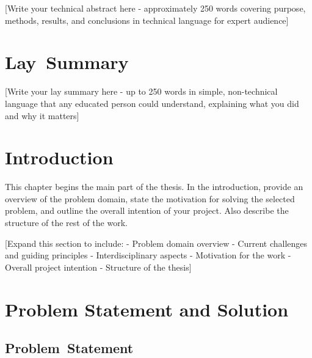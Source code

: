 \documentclass[11pt,a4paper,oneside]{book}
\begin{document}
[Write your technical abstract here - approximately 250 words covering purpose, methods, results, and conclusions in technical language for expert audience]

\chapter*{Lay~Summary}

[Write your lay summary here - up to 250 words in simple, non-technical language that any educated person could understand, explaining what you did and why it matters]

\chapter{Introduction}

This chapter begins the main part of the thesis. In the introduction, provide an overview of the problem domain, state the motivation for solving the selected problem, and outline the overall intention of your project. Also describe the structure of the rest of the work.

[Expand this section to include:
- Problem domain overview
- Current challenges and guiding principles
- Interdisciplinary aspects
- Motivation for the work
- Overall project intention
- Structure of the thesis]


\chapter{Problem Statement and Solution } %

\section{Problem~Statement}
\end{document}

